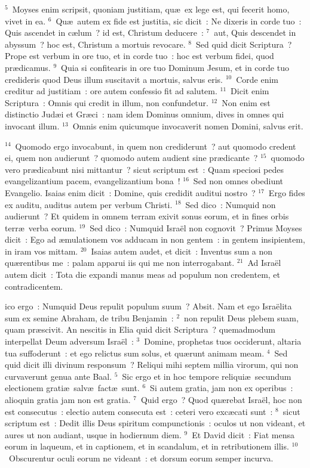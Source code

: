 ${}^{5}$~Moyses enim scripsit, quoniam justitiam, qu\ae\ ex lege est, qui fecerit homo, vivet in ea.
${}^{6}$~Qu\ae\ autem ex fide est justitia, sic dicit~: Ne dixeris in corde tuo~: Quis ascendet in c\ae lum~? id est, Christum deducere~:
${}^{7}$~aut, Quis descendet in abyssum~? hoc est, Christum a mortuis revocare.
${}^{8}$~Sed quid dicit Scriptura~? Prope est verbum in ore tuo, et in corde tuo~: hoc est verbum fidei, quod pr\ae dicamus.
${}^{9}$~Quia si confitearis in ore tuo Dominum Jesum, et in corde tuo credideris quod Deus illum suscitavit a mortuis, salvus eris.
${}^{10}$~Corde enim creditur ad justitiam~: ore autem confessio fit ad salutem.
${}^{11}$~Dicit enim Scriptura~: Omnis qui credit in illum, non confundetur.
${}^{12}$~Non enim est distinctio Jud\ae i et Gr\ae ci~: nam idem Dominus omnium, dives in omnes qui invocant illum.
${}^{13}$~Omnis enim quicumque invocaverit nomen Domini, salvus erit.


${}^{14}$~Quomodo ergo invocabunt, in quem non crediderunt~? aut quomodo credent ei, quem non audierunt~? quomodo autem audient sine pr\ae dicante~?
${}^{15}$~quomodo vero pr\ae dicabunt nisi mittantur~? sicut scriptum est~: Quam speciosi pedes evangelizantium pacem, evangelizantium bona~!
${}^{16}$~Sed non omnes obediunt Evangelio. Isaias enim dicit~: Domine, quis credidit auditui nostro~?
${}^{17}$~Ergo fides ex auditu, auditus autem per verbum Christi.
${}^{18}$~Sed dico~: Numquid non audierunt~? Et quidem in omnem terram exivit sonus eorum, et in fines orbis terr\ae\ verba eorum.
${}^{19}$~Sed dico~: Numquid Isra\"el non cognovit~? Primus Moyses dicit~: Ego ad \ae mulationem vos adducam in non gentem~: in gentem insipientem, in iram vos mittam.
${}^{20}$~Isaias autem audet, et dicit~: Inventus sum a non qu\ae rentibus me~: palam apparui iis qui me non interrogabant.
${}^{21}$~Ad Isra\"el autem dicit~: Tota die expandi manus meas ad populum non credentem, et contradicentem.

\bchapter
{}ico ergo~: Numquid Deus repulit populum suum~? Absit. Nam et ego Isra\"elita sum ex semine Abraham, de tribu Benjamin~:
${}^{2}$~non repulit Deus plebem suam, quam pr\ae scivit. An nescitis in Elia quid dicit Scriptura~? quemadmodum interpellat Deum adversum Isra\"el~:
${}^{3}$~Domine, prophetas tuos occiderunt, altaria tua suffoderunt~: et ego relictus sum solus, et qu\ae runt animam meam.
${}^{4}$~Sed quid dicit illi divinum responsum~? Reliqui mihi septem millia virorum, qui non curvaverunt genua ante Baal.
${}^{5}$~Sic ergo et in hoc tempore reliqui\ae\ secundum electionem grati\ae\ salv\ae\ fact\ae\ sunt.
${}^{6}$~Si autem gratia, jam non ex operibus~: alioquin gratia jam non est gratia.
${}^{7}$~Quid ergo~? Quod qu\ae rebat Isra\"el, hoc non est consecutus~: electio autem consecuta est~: ceteri vero exc\ae cati sunt~:
${}^{8}$~sicut scriptum est~: Dedit illis Deus spiritum compunctionis~: oculos ut non videant, et aures ut non audiant, usque in hodiernum diem.
${}^{9}$~Et David dicit~: Fiat mensa eorum in laqueum, et in captionem, et in scandalum, et in retributionem illis.
${}^{10}$~Obscurentur oculi eorum ne videant~: et dorsum eorum semper incurva.



